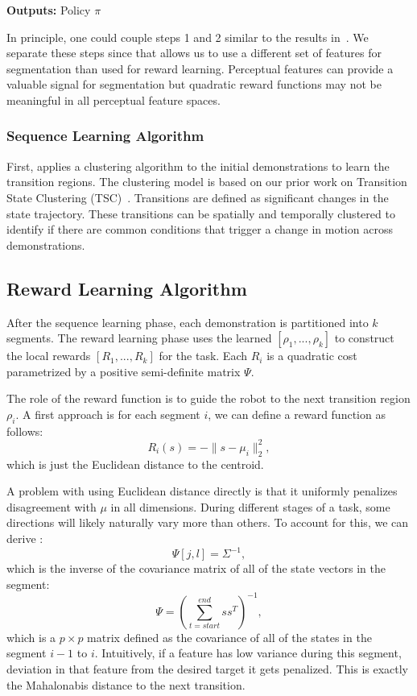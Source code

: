\noindent\textbf{Outputs:} Policy $\pi$

\vspace{4pt}

In principle, one could couple steps 1 and 2 similar to the results in~\cite{ranchod2015nonparametric}. We separate these steps since that allows us to use a different set of features for segmentation than used for reward learning. Perceptual features can provide a valuable signal for segmentation but quadratic reward functions may not be meaningful in all perceptual feature spaces. 

\subsubsection{Sequence Learning Algorithm}
First, \hirl applies a clustering algorithm to the initial demonstrations to learn the transition regions. The clustering model is based on our prior work on Transition State Clustering (TSC)~\cite{krishnan2015tsc,murali2016}. Transitions are defined as significant changes in the state trajectory. These transitions can be spatially and temporally clustered to identify if there are common conditions that trigger a change in motion across demonstrations.

\subsection{Reward Learning Algorithm}\label{sec:reward}
After the sequence learning phase, each demonstration is partitioned into $k$ segments.
The reward learning phase uses the learned $[\rho_1,...,\rho_k]$ to construct the local rewards $[R_1,...,R_k]$ for the task.
Each $R_i$ is a quadratic cost parametrized by a positive semi-definite matrix $\Psi$.


The role of the reward function is to guide the robot to the next transition region $\rho_i$.
A first approach is for each segment $i$, we can define a reward function as follows:
\[
R_i(s) = -\|s - \mu_{i}\|_2^2, 
\]
which is just the Euclidean distance to the centroid.

A problem with using Euclidean distance directly is that it uniformly penalizes disagreement with $\mu$ in all dimensions.
During different stages of a task, some directions will likely naturally vary more than others.
To account for this, we can derive :
\[
\Psi[j,l] = \Sigma^{-1},
\]
which is the inverse of the covariance matrix of all of the state vectors in the segment:
\begin{equation}
\Psi = (\sum_{t=start}^{end} s s^T)^{-1},
\label{localq}
\end{equation}
which is a $p \times p$ matrix defined as the covariance of all of the states in the segment $i-1$ to $i$.
Intuitively, if a feature has low variance during this segment, deviation in that feature from the desired target it gets penalized. 
This is exactly the Mahalonabis distance to the next transition. 

